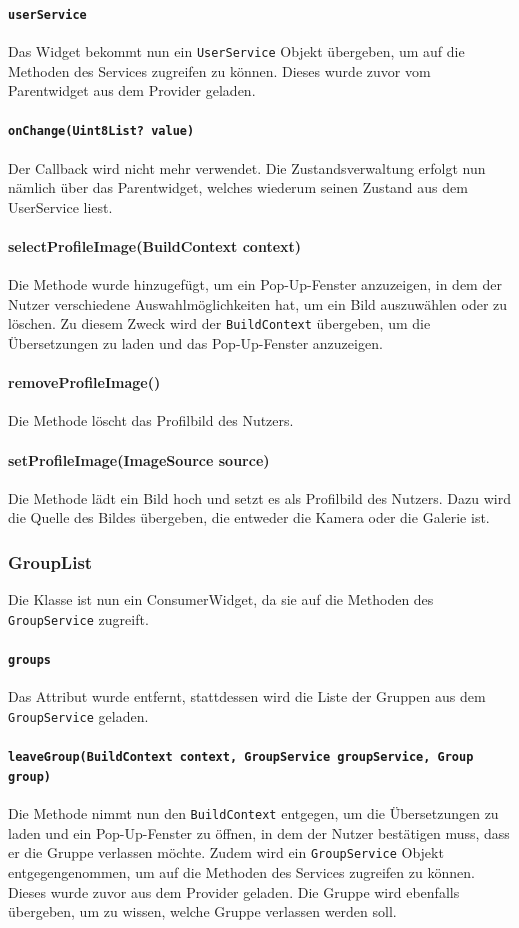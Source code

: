 \documentclass{implementierungsheft}
\begin{document}
\paragraph{\texttt{userService}}
Das Widget bekommt nun ein \texttt{UserService} Objekt übergeben, um auf die Methoden des Services zugreifen zu können. Dieses wurde zuvor vom Parentwidget aus dem Provider geladen.
\paragraph{\texttt{onChange(Uint8List? value)}}
Der Callback wird nicht mehr verwendet. Die Zustandsverwaltung erfolgt nun nämlich über das Parentwidget, welches wiederum seinen Zustand aus dem UserService liest.
\paragraph{selectProfileImage(BuildContext context)}
Die Methode wurde hinzugefügt, um ein Pop-Up-Fenster anzuzeigen, in dem der Nutzer verschiedene Auswahlmöglichkeiten hat, um ein Bild auszuwählen oder zu löschen. Zu diesem Zweck wird der \texttt{BuildContext} übergeben, um die Übersetzungen zu laden und das Pop-Up-Fenster anzuzeigen.
\paragraph*{removeProfileImage()}
Die Methode löscht das Profilbild des Nutzers.
\paragraph*{setProfileImage(ImageSource source)}
Die Methode lädt ein Bild hoch und setzt es als Profilbild des Nutzers. Dazu wird die Quelle des Bildes übergeben, die entweder die Kamera oder die Galerie ist.
\subsubsection*{GroupList}
Die Klasse ist nun ein ConsumerWidget, da sie auf die Methoden des \texttt{GroupService} zugreift.
\paragraph{\texttt{groups}}
Das Attribut wurde entfernt, stattdessen wird die Liste der Gruppen aus dem \texttt{GroupService} geladen.
\paragraph{\texttt{leaveGroup(BuildContext context, GroupService groupService, Group group)}}
Die Methode nimmt nun den \texttt{BuildContext} entgegen, um die Übersetzungen zu laden und ein Pop-Up-Fenster zu öffnen, in dem der Nutzer bestätigen muss, dass er die Gruppe verlassen möchte. Zudem wird ein \texttt{GroupService} Objekt entgegengenommen, um auf die Methoden des Services zugreifen zu können. Dieses wurde zuvor aus dem Provider geladen. Die Gruppe wird ebenfalls übergeben, um zu wissen, welche Gruppe verlassen werden soll.
\end{document}
